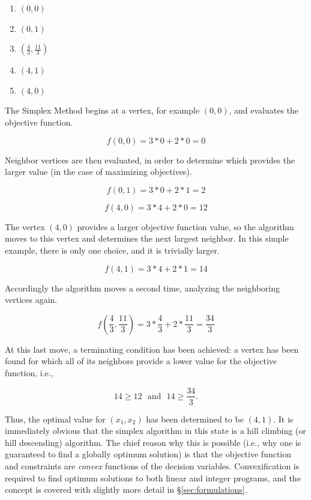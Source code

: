 \begin{enumerate}
  \item $(0, 0)$
  \item $(0, 1)$
  \item $(\frac{4}{3}, \frac{11}{3})$
  \item $(4, 1)$
  \item $(4, 0)$
\end{enumerate}

The Simplex Method begins at a vertex, for example $(0, 0)$, and evaluates the
objective function.

\begin{equation}
    f(0, 0) = 3 * 0 + 2 * 0 = 0 
\end{equation}

Neighbor vertices are then evaluated, in order to determine which provides the
larger value (in the case of maximizing objectives).

\begin{equation}
    f(0, 1) = 3 * 0 + 2 * 1 = 2 
\end{equation}

\begin{equation}
    f(4, 0) = 3 * 4 + 2 * 0 = 12 
\end{equation}

The vertex $(4, 0)$ provides a larger objective function value, so the algorithm
moves to this vertex and determines the next largest neighbor. In this simple
example, there is only one choice, and it is trivially larger.

\begin{equation}
    f(4, 1) = 3 * 4 + 2 * 1 = 14 
\end{equation}

Accordingly the algorithm moves a second time, analyzing the neighboring
vertices again.

\begin{equation}
    f(\frac{4}{3}, \frac{11}{3}) = 3 * \frac{4}{3} + 2 * \frac{11}{3} = \frac{34}{3} 
\end{equation}

At this last move, a terminating condition has been achieved: a vertex has been
found for which all of its neighbors provide a lower value for the objective
function, i.e.,

\begin{equation}
    14 \geq 12 \:\:\: \text{and} \:\:\: 14 \geq \frac{34}{3}.
\end{equation}

Thus, the optimal value for $(x_1, x_2)$ has been determined to be $(4, 1)$. It
is immediately obvious that the simplex algorithm in this state is a hill
climbing (or hill descending) algorithm. The chief reason why this is possible
(i.e., why one is guaranteed to find a globally optimum solution) is that the
objective function and constraints are \textit{convex} functions of the decision
variables. Convexification is required to find optimum solutions to both linear
and integer programs, and the concept is covered with slightly more detail
in \S \ref{sec:formulations}.

